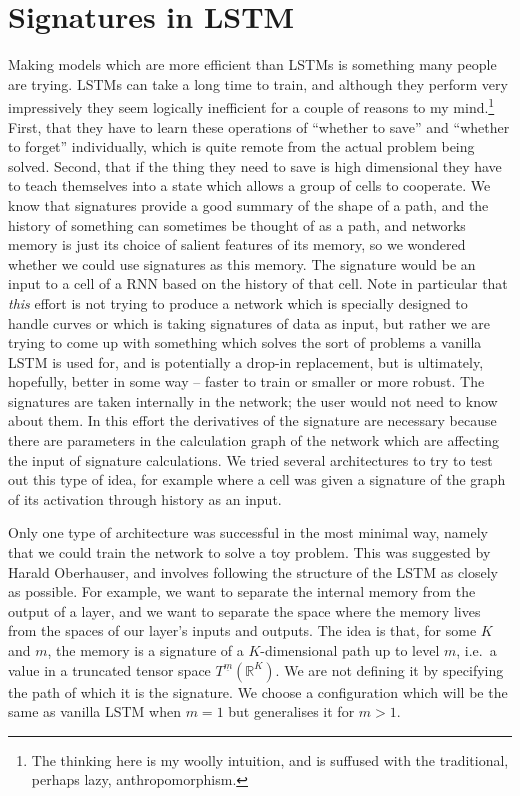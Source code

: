 \section{Signatures in LSTM}
\label{sec:lstmsig}
\def\inV{i}
\def\outV{f}
\def\inputindex{l}
Making models which are more efficient than LSTMs is something many people are trying.
LSTMs can take a long time to train, and although they perform very impressively they seem logically inefficient for a couple of reasons to my mind.\footnote{The thinking here is my woolly intuition, and is suffused with the traditional, perhaps lazy, anthropomorphism.}
First, that they have to learn these operations of ``whether to save'' and ``whether to forget'' individually, which is quite remote from the actual problem being solved.
Second, that if the thing they need to save is high dimensional they have to teach themselves into a state which allows a group of cells to cooperate.
We know that signatures provide a good summary of the shape of a path, and the history of something can sometimes be thought of as a path, and networks memory is just its choice of salient features of its memory, so we wondered whether we could  use signatures as this memory.
The signature would be an input to a cell of a RNN based on the history of that cell.
Note in particular that \emph{this} effort is not trying to produce a network which is specially designed to handle curves or which is taking signatures of data as input, but rather we are trying to come up with something which solves the sort of problems a vanilla LSTM is used for, and is potentially a drop-in replacement, but is ultimately, hopefully, better in some way -- faster to train or smaller or more robust.
The signatures are taken internally in the network; the user would not need to know about them.
In this effort the derivatives of the signature are necessary because there are parameters in the calculation graph of the network which are affecting the input of signature calculations.
We tried several architectures to try to test out this type of idea, for example where a cell was given a signature of the graph of its activation through history as an input.

Only one type of architecture was successful in the most minimal way, namely that we could train the network to solve a toy problem.
This was suggested by Harald Oberhauser, and involves following the structure of the LSTM as closely as possible. 
For example, we want to separate the internal memory from the output of a layer, and we want to separate the space where the memory lives from the spaces of our layer's inputs and outputs.
The idea is that, for some $K$ and $m$, the memory is a signature of a $K$-dimensional path up to level $m$,
i.e.~a value in a truncated tensor space $T^{\underline m}(\mathbb{R}^K)$. We are not defining it by specifying the path of which it is the signature. We choose a configuration which will be the same as vanilla LSTM when $m=1$ but generalises it for $m>1$.

